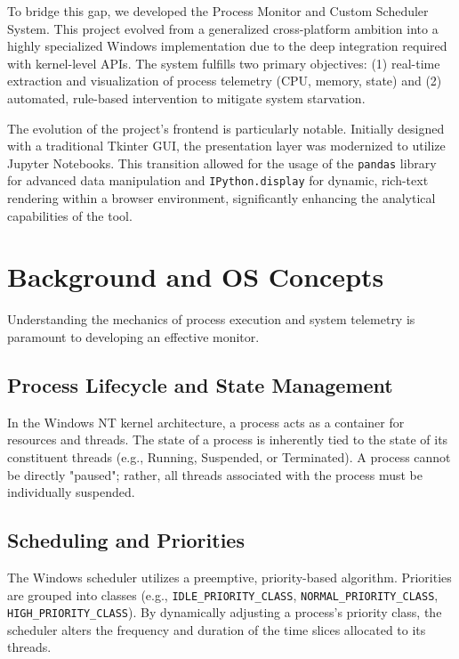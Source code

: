 \documentclass{article}
\begin{document}
To bridge this gap, we developed the Process Monitor and Custom Scheduler System. This project evolved from a generalized cross-platform ambition into a highly specialized Windows implementation due to the deep integration required with kernel-level APIs. The system fulfills two primary objectives: (1) real-time extraction and visualization of process telemetry (CPU, memory, state) and (2) automated, rule-based intervention to mitigate system starvation. 

The evolution of the project's frontend is particularly notable. Initially designed with a traditional Tkinter GUI, the presentation layer was modernized to utilize Jupyter Notebooks. This transition allowed for the usage of the \texttt{pandas} library for advanced data manipulation and \texttt{IPython.display} for dynamic, rich-text rendering within a browser environment, significantly enhancing the analytical capabilities of the tool.

\section{Background and OS Concepts}
Understanding the mechanics of process execution and system telemetry is paramount to developing an effective monitor.

\subsection{Process Lifecycle and State Management}
In the Windows NT kernel architecture, a process acts as a container for resources and threads. The state of a process is inherently tied to the state of its constituent threads (e.g., Running, Suspended, or Terminated). A process cannot be directly "paused"; rather, all threads associated with the process must be individually suspended.

\subsection{Scheduling and Priorities}
The Windows scheduler utilizes a preemptive, priority-based algorithm. Priorities are grouped into classes (e.g., \texttt{IDLE\_PRIORITY\_CLASS}, \texttt{NORMAL\_PRIORITY\_CLASS}, \texttt{HIGH\_PRIORITY\_CLASS}). By dynamically adjusting a process's priority class, the scheduler alters the frequency and duration of the time slices allocated to its threads.
\end{document}
